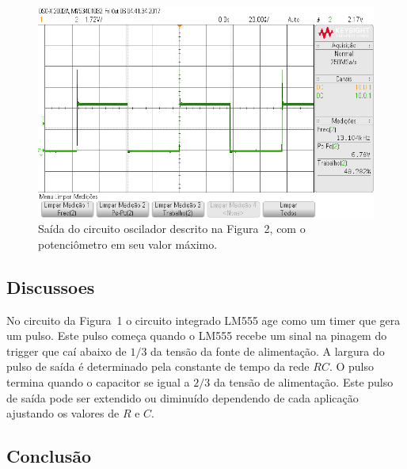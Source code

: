 \documentclass[12pt,a4paper]{article}
\begin{document}
\begin{figure}[htpb]
  \centering
  \includegraphics[width=0.8\linewidth]{img/max.jpg}
  \caption{Saída do circuito oscilador descrito na Figura~2, com o potenciômetro em seu valor máximo. }
  \label{fig:3}
\end{figure}
\subsection{Discussoes}
No circuito da Figura~1 o circuito integrado LM555 age como um timer que gera um pulso. Este pulso começa quando o LM555 recebe um sinal na pinagem do trigger que caí abaixo de $1/3$ da tensão da fonte de alimentação. A largura do pulso de saída é determinado pela constante de tempo da rede $RC$. O pulso termina quando o capacitor se igual a $2/3$ da tensão de alimentação. Este pulso de saída pode ser extendido ou diminuído dependendo de cada aplicação ajustando os valores de $R$ e $C$. 
\subsection{Conclusão}
\end{document}
